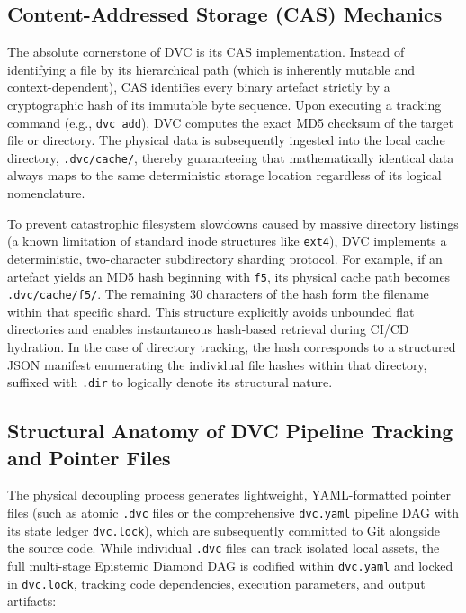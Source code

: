 \subsection{Content-Addressed Storage (CAS) Mechanics}
The absolute cornerstone of DVC is its CAS implementation. Instead of identifying a file by its hierarchical path (which is inherently mutable and context-dependent), CAS identifies every binary artefact strictly by a cryptographic hash of its immutable byte sequence. Upon executing a tracking command (e.g., \texttt{dvc add}), DVC computes the exact MD5 checksum of the target file or directory. The physical data is subsequently ingested into the local cache directory, \texttt{.dvc/cache/}, thereby guaranteeing that mathematically identical data always maps to the same deterministic storage location regardless of its logical nomenclature.

To prevent catastrophic filesystem slowdowns caused by massive directory listings (a known limitation of standard inode structures like \texttt{ext4}), DVC implements a deterministic, two-character subdirectory sharding protocol. For example, if an artefact yields an MD5 hash beginning with \texttt{f5}, its physical cache path becomes \texttt{.dvc/cache/f5/}. The remaining 30 characters of the hash form the filename within that specific shard. This structure explicitly avoids unbounded flat directories and enables instantaneous hash-based retrieval during CI/CD hydration. In the case of directory tracking, the hash corresponds to a structured JSON manifest enumerating the individual file hashes within that directory, suffixed with \texttt{.dir} to logically denote its structural nature.

\subsection{Structural Anatomy of DVC Pipeline Tracking and Pointer Files}
The physical decoupling process generates lightweight, YAML-formatted pointer files (such as atomic \texttt{.dvc} files or the comprehensive \texttt{dvc.yaml} pipeline DAG with its state ledger \texttt{dvc.lock}), which are subsequently committed to Git alongside the source code. While individual \texttt{.dvc} files can track isolated local assets, the full multi-stage Epistemic Diamond DAG is codified within \texttt{dvc.yaml} and locked in \texttt{dvc.lock}, tracking code dependencies, execution parameters, and output artifacts:

